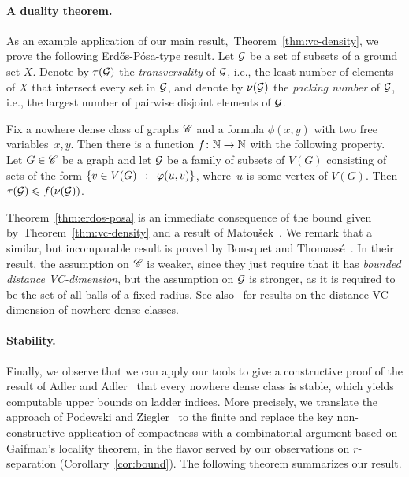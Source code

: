 \paragraph{A duality theorem.}
As an example application of our main
result,~Theorem~\ref{thm:vc-density}, we prove the following
Erd\H{o}s-P\'{o}sa-type result. Let $\cal G$ be a set of subsets of a
ground set $X$. Denote by $\tau(\cal G)$ the \emph{transversality} of
$\cal G$, i.e., the least number of elements of $X$ that intersect
every set in $\cal G$, and denote by $\nu(\cal G)$ the \emph{packing
  number} of $\cal G$, i.e., the largest number of pairwise disjoint
elements of $\cal G$.
 
\setcounter{ep}{\value{theorem}}
\begin{theorem}\label{thm:erdos-posa}
  Fix a nowhere dense class of graphs $\CCC$ and a formula $\phi(x,y)$
  with two free variables~$x,y$.  Then there is a function
  $f\from \N\to\N$ with the following property.  Let $G\in \CCC$ be a
  graph and let $\cal G$ be a family of subsets of $V(G)$ consisting
  of sets of the form $\setof{v\in V(G)}{\phi(u, v)}$, where~$u$ is
  some vertex of $V(G)$.  Then~$\tau({\cal G})\le f(\nu(\cal G))$.
\end{theorem}

Theorem~\ref{thm:erdos-posa} is an immediate consequence of the bound
given by~Theorem~\ref{thm:vc-density} and a result of Matou{\v
  s}ek~\cite{Matousek:2004:BVI:1005787.1005789}.  We remark that a
similar, but incomparable result is proved by Bousquet and
Thomass{\'e}~\cite{BousquetT15}.  In their result, the assumption on
$\CCC$ is weaker, since they just require that it has \emph{bounded
  distance VC-dimension}, but the assumption on $\cal G$ is stronger,
as it is required to be the set of all balls of a fixed radius. See also~\cite{PSdistis}
for results on the distance VC-dimension of nowhere dense classes. 





\paragraph{Stability.}
Finally, we observe that we can apply our tools to give a constructive
proof of the result of Adler and Adler~\cite{adler2014interpreting}
that every nowhere dense class is stable, which yields computable
upper bounds on ladder indices.  More precisely, we translate the
approach of Podewski and Ziegler~\cite{podewski1978stable} to the
finite and replace the key non-constructive application of compactness
with a combinatorial argument based on Gaifman's locality theorem, in the
flavor served by our observations on \mbox{$r$-separation}
(Corollary~\ref{cor:bound}).  The following theorem summarizes our
result.

